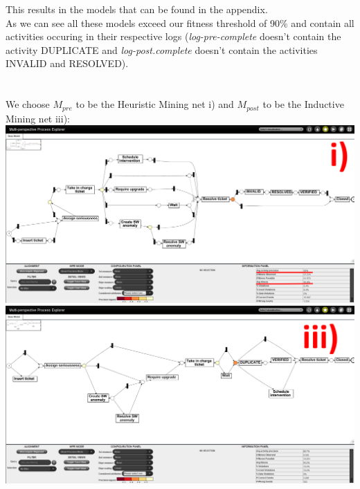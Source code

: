 \documentclass[../../main.tex]{subfiles}
\begin{document}
This results in the models that can be found in the appendix.\\
As we can see all these models exceed our fitness threshold of 90\% and contain all activities occuring in their respective logs (\textit{log-pre-complete} doesn't contain the activity DUPLICATE and \textit{log-post.complete} doesn't contain the activities INVALID and RESOLVED).\\
\\ \ \\
We choose $M_{pre}$ to be the Heuristic Mining net i) and $M_{post}$ to be the Inductive Mining net iii):\\
\includegraphics[width=0.5\columnwidth]{Question_2/img/ProM_b_PRE_i.png}
\includegraphics[width=0.5\columnwidth]{Question_2/img/ProM_b_inductive_POST_iii.png}\\
\end{document}
